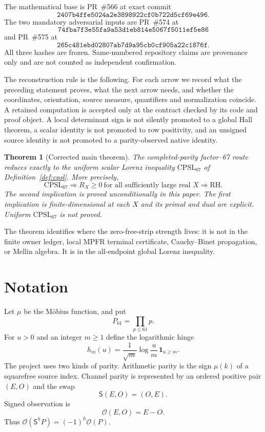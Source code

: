 \documentclass[11pt]{article}
\newtheorem{theorem}{Theorem}[section]
\newcommand{\RH}{\mathrm{RH}}
\newcommand{\Obs}{\mathcal O}
\newcommand{\CPSL}{\mathrm{CPSL}_{67}}
\newcommand{\1}{\mathbf 1}
\begin{document}
The mathematical base is PR~\#566 at exact commit
\[
\texttt{2407b4ffe5024a2e3898922cf0b722d5cf69e496}.
\]
The two mandatory adversarial inputs are PR~\#574 at
\[
\texttt{74fba7f3e55fa9a53d1eb814e5067f5011ef5e86}
\]
and PR~\#575 at
\[
\texttt{265c481ebd02807ab7d9a95cb0cf905a22c1876f}.
\]
All three hashes are frozen.  Same-numbered repository claims are provenance only and are not counted as independent confirmation.

The reconstruction rule is the following.  For each arrow we record what the preceding statement proves, what the next arrow needs, and whether the coordinates, orientation, source measure, quantifiers and normalization coincide.  A retained computation is accepted only at the contract checked by its code and proof object.  A local determinant sign is not silently promoted to a global Hall theorem, a scalar identity is not promoted to row positivity, and an unsigned source identity is not promoted to a parity-observed native identity.

\begin{theorem}[Corrected main theorem]\label{thm:main}
The completed-parity factor--67 route reduces exactly to the uniform scalar Lorenz inequality $\CPSL$ of Definition~\ref{def:cpsl}.  More precisely,
\[
\CPSL\Longrightarrow R_X\ge0\ \text{for all sufficiently large real }X
\Longrightarrow \RH.
\]
The second implication is proved unconditionally in this paper.  The first implication is finite-dimensional at each $X$ and its primal and dual are explicit.  Uniform $\CPSL$ is not proved.
\end{theorem}

The theorem identifies where the zero-free-strip strength lives: it is not in the finite owner ledger, local MPFR terminal certificate, Cauchy--Binet propagation, or Mellin algebra.  It is in the all-endpoint global Lorenz inequality.

\section{Notation}

Let $\mu$ be the M\"obius function, and put
\[
P_{61}=\prod_{p\le61}p.
\]
For $u>0$ and an integer $m\ge1$ define the logarithmic hinge
\[
h_m(u)=\frac1{\sqrt m}\log\frac um\,\1_{u\ge m}.
\]
The project uses two kinds of parity.  Arithmetic parity is the sign $\mu(k)$ of a squarefree source index.  Channel parity is represented by an ordered positive pair $(E,O)$ and the swap
\[
\mathsf S(E,O)=(O,E).
\]
Signed observation is
\[
\Obs(E,O)=E-O.
\]
Thus $\Obs(\mathsf S^hP)=(-1)^h\Obs(P)$.
\end{document}
